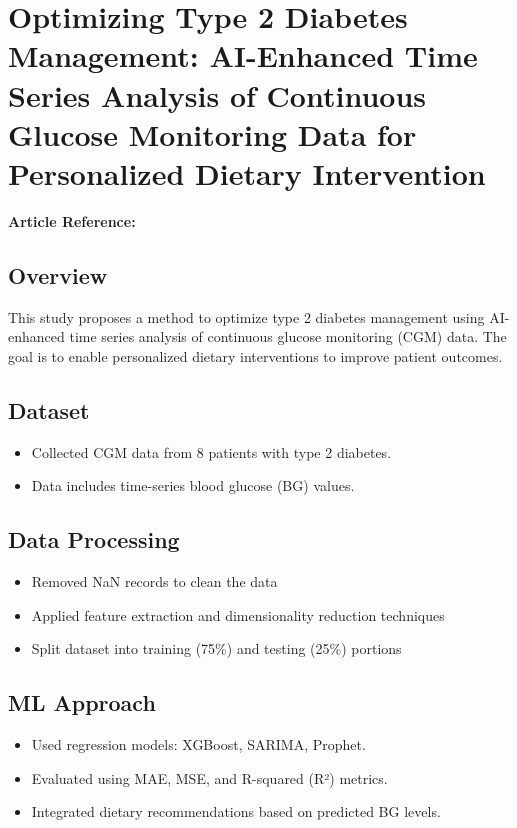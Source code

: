 \section{Optimizing Type 2 Diabetes Management: AI-Enhanced Time Series Analysis of Continuous Glucose Monitoring Data for Personalized Dietary Intervention}
\textbf{Article Reference:} \cite{article_9}

\subsection*{Overview}
This study proposes a method to optimize type 2 diabetes management using AI-enhanced time series analysis of continuous glucose monitoring (CGM) data. The goal is to enable personalized dietary interventions to improve patient outcomes.

\subsection*{Dataset}
\begin{itemize}
    \item Collected CGM data from 8 patients with type 2 diabetes.
    \item Data includes time-series blood glucose (BG) values.
\end{itemize}

\subsection*{Data Processing}
\begin{itemize}
    \item Removed NaN records to clean the data
    \item Applied feature extraction and dimensionality reduction techniques
    \item Split dataset into training (75\%) and testing (25\%) portions
\end{itemize}

\subsection*{ML Approach}
\begin{itemize}
    \item Used regression models: XGBoost, SARIMA, Prophet.
    \item Evaluated using MAE, MSE, and R-squared (R²) metrics.
    \item Integrated dietary recommendations based on predicted BG levels.
\end{itemize}

